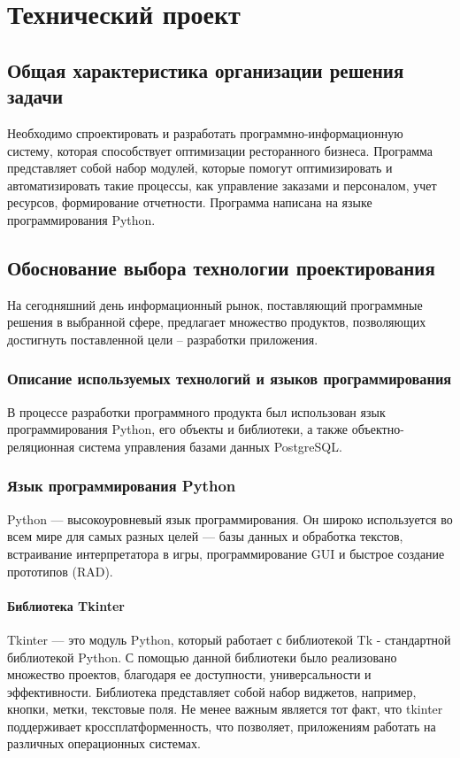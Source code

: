 \section{Технический проект}


\subsection{Общая характеристика организации решения задачи}
Необходимо спроектировать и разработать программно-информационную систему, которая способствует оптимизации ресторанного бизнеса.  
Программа представляет собой набор модулей, которые помогут оптимизировать и автоматизировать такие процессы, как управление заказами и персоналом, учет ресурсов, формирование отчетности.
Программа написана на языке программирования Python.


\subsection{Обоснование выбора технологии проектирования}
На сегодняшний день информационный рынок, поставляющий программные решения в выбранной сфере, предлагает множество продуктов, позволяющих достигнуть поставленной цели – разработки приложения.


\subsubsection{Описание используемых технологий и языков программирования}
В процессе разработки программного продукта был использован язык программирования Python, его объекты и библиотеки, а также объектно-реляционная система управления базами данных PostgreSQL\cite{postgres}.


\subsubsection{Язык программирования Python}
Python — высокоуровневый язык программирования. Он широко используется во всем мире для самых разных целей — базы данных и обработка текстов, встраивание интерпретатора в игры, программирование GUI и быстрое создание прототипов (RAD)\cite{python}.

\paragraph{Библиотека Tkinter}
Tkinter — это модуль Python, который работает с библиотекой Tk - стандартной библиотекой Python\cite{tkitner}. С помощью данной библиотеки было реализовано множество проектов, благодаря ее доступности, универсальности и эффективности. Библиотека представляет собой набор виджетов, например, кнопки, метки, текстовые поля. Не менее важным является тот факт, что tkinter поддерживает кроссплатформенность, что позволяет, приложениям работать на различных операционных системах\cite{guipython}.

